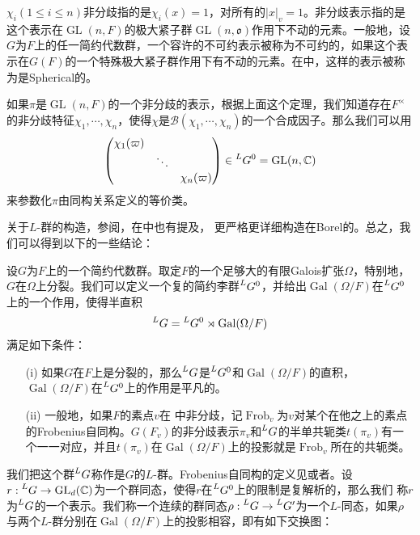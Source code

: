 $\chi_i (1 \leqslant i \leqslant n)$非分歧指的是$\chi_i(x) = 1$，对所有的$\lvert x \rvert_v = 1$。非分歧表示指的是这个表示在$\operatorname{GL}(n, F)$的极大紧子群$\operatorname{GL}(n, \mathfrak{o})$作用下不动的元素。一般地，设$G$为$F$上的任一简约代数群，一个容许的不可约表示被称为不可约的，如果这个表示在$G(F)$的一个特殊极大紧子群作用下有不动的元素。在中，这样的表示被称为是Spherical的。

如果$\pi$是$\operatorname{GL}(n, F)$的一个非分歧的表示，根据上面这个定理，我们知道存在$F^\times$的非分歧特征$\chi_1, \cdots, \chi_n$，使得$\chi$是$\mathcal{B}(\chi_1, \cdots, \chi_n)$的一个合成因子。那么我们可以用
$$
\begin{pmatrix}
\chi_1(\varpi) & & \\
& \ddots & \\
& & \chi_n(\varpi)
\end{pmatrix} \in \prescript{L}{}{G}^0 = \operatorname{GL}(n, \mathbb{C})
$$
来参数化$\pi$由同构关系定义的等价类。

关于$L$-群的构造，参阅，在中也有提及， 更严格更详细构造在Borel的。总之，我们可以得到以下的一些结论：

设$G$为$F$上的一个简约代数群。取定$F$的一个足够大的有限Galois扩张$\Omega$，特别地，$G$在$\Omega$上分裂。我们可以定义一个复的简约李群$\prescript{L}{}{G}^0$，并给出$\operatorname{Gal}(\Omega/F)$在$\prescript{L}{}{G}^0$上的一个作用，使得半直积
$$
\prescript{L}{}{G} = \prescript{L}{}{G}^0 \rtimes \operatorname{Gal}(\Omega/F)
$$
满足如下条件：
\begin{itemize}
\item[(i)] 如果$G$在$F$上是分裂的，那么$\prescript{L}{}{G}$是$\prescript{L}{}{G}^0$和$\operatorname{Gal}(\Omega/F)$的直积，$\operatorname{Gal}(\Omega/F)$在$\prescript{L}{}{G}^0$上的作用是平凡的。
\item[(ii)] 一般地，如果$F$的素点$v$在
中非分歧，记$\operatorname{Frob}_v$为$v$对某个在他之上的素点的Frobenius自同构。$G(F_v)$的非分歧表示$\pi_v$和$\prescript{L}{}{G}$的半单共轭类$t(\pi_v)$有一个一一对应，并且$t(\pi_v)$在$\operatorname{Gal}(\Omega/F)$上的投影就是$\operatorname{Frob}_v$所在的共轭类。
\end{itemize}

我们把这个群$\prescript{L}{}{G}$称作是$G$的$L$-群。Frobenius自同构的定义见或者。设$r : \prescript{L}{}{G} \rightarrow \operatorname{GL}_d(\mathbb{C})$为一个群同态，使得$r$在$\prescript{L}{}{G}^0$上的限制是复解析的，那么我们
称$r$为$\prescript{L}{}{G}$的一个表示。我们称一个连续的群同态$\rho: \prescript{L}{}{G} \rightarrow \prescript{L}{}{G}'$为一个$L$-同态，如果$\rho$与两个$L$-群分别在$\operatorname{Gal}(\Omega/F)$上的投影相容，即有如下交换图：

